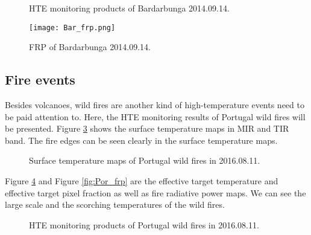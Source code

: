 \begin{figure}[!htbp]
\centering
{}
\hspace{0.1in}
\caption{HTE monitoring products of Bardarbunga 2014.09.14.}
\label{fig:Bar_HTE}
\end{figure}

\begin{figure}[!htbp]
\centering
\texttt{[image: Bar\_frp.png]}
\caption{FRP of Bardarbunga 2014.09.14.}
\label{fig:Bar_frp}
\end{figure}

\subsection{Fire events}
Besides volcanoes, wild fires are another kind of high-temperature events need to be paid attention to. Here, the HTE monitoring results of Portugal wild fires will be presented. Figure \ref{fig:Por_sur_tem} shows the surface temperature maps in MIR and TIR band. The fire edges can be seen clearly in the surface temperature maps.\\

\begin{figure}
\centering
{}
\hspace{0.1in}
\caption{Surface temperature maps of Portugal wild fires in 2016.08.11.}
\label{fig:Por_sur_tem}
\end{figure}

\noindent Figure \ref{fig:Por_HTE} and Figure \ref{fig:Por_frp} are the effective target temperature and effective target pixel fraction as well as fire radiative power maps. We can see the large scale and the scorching temperatures of the wild fires.

\begin{figure}[!htbp]
\centering
{}
\hspace{0.1in}
\caption{HTE monitoring products of Portugal wild fires in 2016.08.11.}
\label{fig:Por_HTE}
\end{figure}

